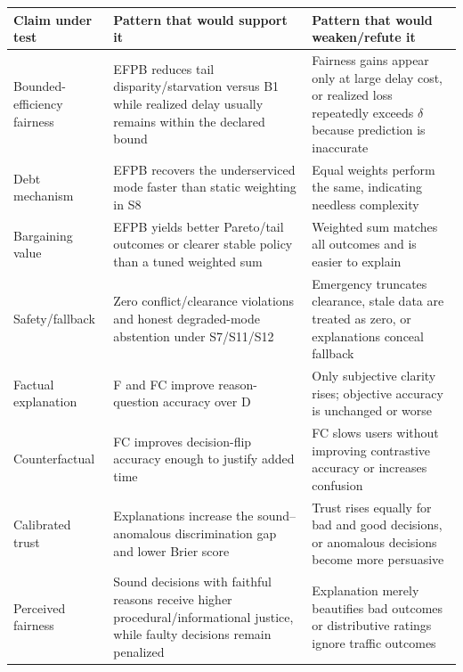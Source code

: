 \documentclass[
  english,
  11pt,
  a4paper,
]{article}
\newcounter{none} %
\begin{document}
{\def\LTcaptype{none} %
\begin{longtable}[]{@{}
  >{\raggedright\arraybackslash}p{}
  >{\raggedright\arraybackslash}p{}
  >{\raggedright\arraybackslash}p{}@{}}
\toprule\noalign{}
\begin{minipage}[b]{\linewidth}\raggedright
Claim under test
\end{minipage} & \begin{minipage}[b]{\linewidth}\raggedright
Pattern that would support it
\end{minipage} & \begin{minipage}[b]{\linewidth}\raggedright
Pattern that would weaken/refute it
\end{minipage} \\
\midrule\noalign{}
\endhead
\bottomrule\noalign{}
\endlastfoot
Bounded-efficiency fairness & EFPB reduces tail disparity/starvation
versus B1 while realized delay usually remains within the declared bound
& Fairness gains appear only at large delay cost, or realized loss
repeatedly exceeds \(\delta\) because prediction is inaccurate \\
Debt mechanism & EFPB recovers the underserviced mode faster than static
weighting in S8 & Equal weights perform the same, indicating needless
complexity \\
Bargaining value & EFPB yields better Pareto/tail outcomes or clearer
stable policy than a tuned weighted sum & Weighted sum matches all
outcomes and is easier to explain \\
Safety/fallback & Zero conflict/clearance violations and honest
degraded-mode abstention under S7/S11/S12 & Emergency truncates
clearance, stale data are treated as zero, or explanations conceal
fallback \\
Factual explanation & F and FC improve reason-question accuracy over D &
Only subjective clarity rises; objective accuracy is unchanged or
worse \\
Counterfactual & FC improves decision-flip accuracy enough to justify
added time & FC slows users without improving contrastive accuracy or
increases confusion \\
Calibrated trust & Explanations increase the sound--anomalous
discrimination gap and lower Brier score & Trust rises equally for bad
and good decisions, or anomalous decisions become more persuasive \\
Perceived fairness & Sound decisions with faithful reasons receive
higher procedural/informational justice, while faulty decisions remain
penalized & Explanation merely beautifies bad outcomes or distributive
ratings ignore traffic outcomes \\
\end{longtable}
}
\end{document}

